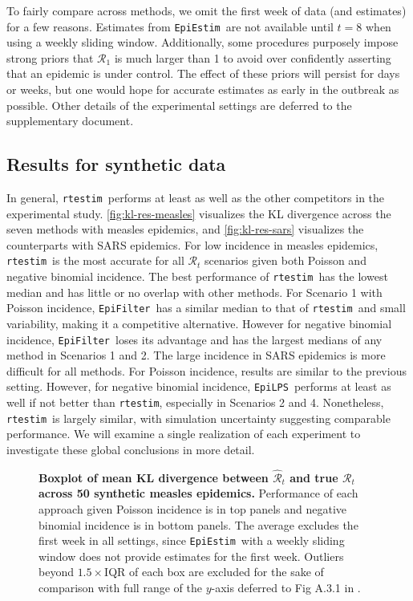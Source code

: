 \documentclass[10pt,letterpaper]{article}
\def\RtEstim{\texttt{rtestim}}
\def\EpiEstim{\texttt{EpiEstim}}
\def\EpiLPS{\texttt{EpiLPS}}
\def\EpiFilter{\texttt{EpiFilter}}
\def\calR{\mathcal{R}}
\renewcommand{\hat}{\widehat}
\begin{document}
To fairly compare across methods, we omit the first week of data (and estimates)
for a few reasons. Estimates from \EpiEstim\ are not available until $t=8$ when
using a weekly sliding window. Additionally, some procedures purposely impose
strong priors that $\calR_1$ is much larger than 1 to avoid over confidently
asserting that an epidemic is under control. The effect of these priors will
persist for days or weeks, but one would hope for accurate estimates as early in
the outbreak as possible. Other details of the experimental settings are
deferred to the supplementary document. 



\subsection{Results for synthetic data}

In general, \RtEstim\ performs at least as well as the other competitors in the
experimental study. \autoref{fig:kl-res-measles} visualizes the KL divergence 
across the seven methods with measles epidemics, and \autoref{fig:kl-res-sars}
visualizes the counterparts with SARS epidemics. For low incidence in
measles epidemics, \RtEstim\ is the most accurate for all $\calR_t$ scenarios
given both Poisson and negative binomial incidence. The best performance of
\RtEstim\ has the lowest median and has little or no overlap with other methods.
For Scenario 1 with Poisson incidence, \EpiFilter\ has a similar median to that
of \RtEstim\ and small variability, making it a competitive alternative. However
for negative binomial incidence, \EpiFilter\ loses its advantage and has the
largest medians of any method in Scenarios 1 and 2. The large incidence in SARS
epidemics is more difficult for all methods. For Poisson incidence, results are
similar to the previous setting. However, for negative binomial incidence,
\EpiLPS\ performs at least as well if not better than \RtEstim, especially in
Scenarios 2 and 4. Nonetheless, \RtEstim\ is largely similar, with simulation
uncertainty suggesting comparable performance. We will examine a single
realization of each experiment to investigate these global conclusions in more
detail.

\begin{figure}[!t]
  \centering
  \caption{{\bf Boxplot of mean KL divergence between $\hat{\calR}_t$ and true
  $\calR_t$ across 50 synthetic measles epidemics.} Performance of each approach given
  Poisson incidence is in top panels and negative binomial incidence is in bottom
  panels. The average excludes the first week in all settings, since
  \EpiEstim\ with a weekly sliding window does not provide estimates for the
  first week. Outliers beyond $1.5\times$IQR of each box are excluded for the
  sake of comparison with full range of the $y$-axis deferred to Fig A.3.1 in
  .} 
  \label{fig:kl-res-measles}
\end{figure}
\end{document}
